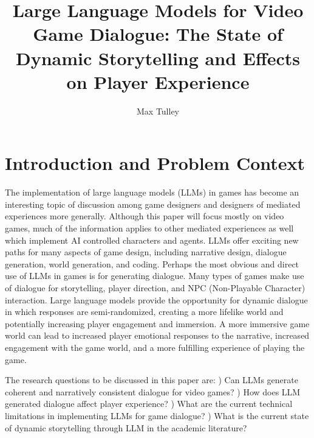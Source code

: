 \documentclass[10pt,twocolumn]{article}
\title{Large Language Models for Video Game Dialogue: The State of Dynamic Storytelling and Effects on Player Experience}
\author{Max Tulley}
\affiliation{Occidental College}
\begin{document}
\maketitle

\section{Introduction and Problem Context}

\noindent The implementation of large language models (LLMs) in games has become an interesting topic of discussion among game designers and designers of mediated experiences more generally. Although this paper will focus mostly on video games, much of the information applies to other mediated experiences as well which implement AI controlled characters and agents. LLMs offer exciting new paths for many aspects of game design, including narrative design, dialogue generation, world generation, and coding. Perhaps the most obvious and direct use of LLMs in games is for generating dialogue. Many types of games make use of dialogue for storytelling, player direction, and NPC (Non-Playable Character) interaction. Large language models provide the opportunity for dynamic dialogue in which responses are semi-randomized, creating a more lifelike world and potentially increasing player engagement and immersion. A more immersive game world can lead to increased player emotional responses to the narrative, increased engagement with the game world, and a more fulfilling experience of playing the game. 

The research questions to be discussed in this paper are:
    ) Can LLMs generate coherent and narratively consistent dialogue for video games? 
    ) How does LLM generated dialogue affect player experience?
    ) What are the current technical limitations in implementing LLMs for game dialogue?
    ) What is the current state of dynamic storytelling through LLM in the academic literature?


\end{document}
